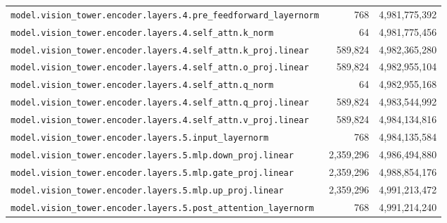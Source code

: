 \documentclass[10pt,a4paper]{article}
\theoremstyle{definition}
\begin{document}
\begin{appendices}
\begin{longtable}{p{9.5cm}rr}
\texttt{model.\allowbreak{}vision\_tower.\allowbreak{}encoder.\allowbreak{}layers.\allowbreak{}4.\allowbreak{}pre\_feedforward\_layernorm} & 768 & 4,981,775,392 \\
\texttt{model.\allowbreak{}vision\_tower.\allowbreak{}encoder.\allowbreak{}layers.\allowbreak{}4.\allowbreak{}self\_attn.\allowbreak{}k\_norm} & 64 & 4,981,775,456 \\
\texttt{model.\allowbreak{}vision\_tower.\allowbreak{}encoder.\allowbreak{}layers.\allowbreak{}4.\allowbreak{}self\_attn.\allowbreak{}k\_proj.\allowbreak{}linear} & 589,824 & 4,982,365,280 \\
\texttt{model.\allowbreak{}vision\_tower.\allowbreak{}encoder.\allowbreak{}layers.\allowbreak{}4.\allowbreak{}self\_attn.\allowbreak{}o\_proj.\allowbreak{}linear} & 589,824 & 4,982,955,104 \\
\texttt{model.\allowbreak{}vision\_tower.\allowbreak{}encoder.\allowbreak{}layers.\allowbreak{}4.\allowbreak{}self\_attn.\allowbreak{}q\_norm} & 64 & 4,982,955,168 \\
\texttt{model.\allowbreak{}vision\_tower.\allowbreak{}encoder.\allowbreak{}layers.\allowbreak{}4.\allowbreak{}self\_attn.\allowbreak{}q\_proj.\allowbreak{}linear} & 589,824 & 4,983,544,992 \\
\texttt{model.\allowbreak{}vision\_tower.\allowbreak{}encoder.\allowbreak{}layers.\allowbreak{}4.\allowbreak{}self\_attn.\allowbreak{}v\_proj.\allowbreak{}linear} & 589,824 & 4,984,134,816 \\
\texttt{model.\allowbreak{}vision\_tower.\allowbreak{}encoder.\allowbreak{}layers.\allowbreak{}5.\allowbreak{}input\_layernorm} & 768 & 4,984,135,584 \\
\texttt{model.\allowbreak{}vision\_tower.\allowbreak{}encoder.\allowbreak{}layers.\allowbreak{}5.\allowbreak{}mlp.\allowbreak{}down\_proj.\allowbreak{}linear} & 2,359,296 & 4,986,494,880 \\
\texttt{model.\allowbreak{}vision\_tower.\allowbreak{}encoder.\allowbreak{}layers.\allowbreak{}5.\allowbreak{}mlp.\allowbreak{}gate\_proj.\allowbreak{}linear} & 2,359,296 & 4,988,854,176 \\
\texttt{model.\allowbreak{}vision\_tower.\allowbreak{}encoder.\allowbreak{}layers.\allowbreak{}5.\allowbreak{}mlp.\allowbreak{}up\_proj.\allowbreak{}linear} & 2,359,296 & 4,991,213,472 \\
\texttt{model.\allowbreak{}vision\_tower.\allowbreak{}encoder.\allowbreak{}layers.\allowbreak{}5.\allowbreak{}post\_attention\_layernorm} & 768 & 4,991,214,240 \\

\end{longtable}
\end{appendices}
\end{document}
